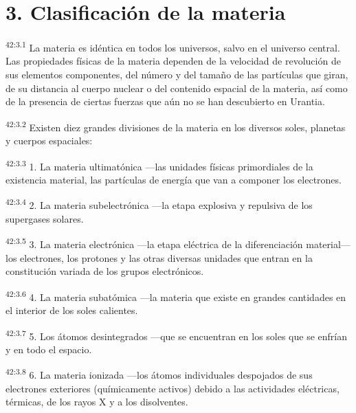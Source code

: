 \section*{3. Clasificación de la materia}
\par
\textsuperscript{42:3.1} La materia es idéntica en todos los universos, salvo en el universo central. Las propiedades físicas de la materia dependen de la velocidad de revolución de sus elementos componentes, del número y del tamaño de las partículas que giran, de su distancia al cuerpo nuclear o del contenido espacial de la materia, así como de la presencia de ciertas fuerzas que aún no se han descubierto en Urantia.

\par
\textsuperscript{42:3.2} Existen diez grandes divisiones de la materia en los diversos soles, planetas y cuerpos espaciales:

\par
\textsuperscript{42:3.3} 1. La materia ultimatónica ---las unidades físicas primordiales de la existencia material, las partículas de energía que van a componer los electrones.

\par
\textsuperscript{42:3.4} 2. La materia subelectrónica ---la etapa explosiva y repulsiva de los supergases solares.

\par
\textsuperscript{42:3.5} 3. La materia electrónica ---la etapa eléctrica de la diferenciación material--- los electrones, los protones y las otras diversas unidades que entran en la constitución variada de los grupos electrónicos.

\par
\textsuperscript{42:3.6} 4. La materia subatómica ---la materia que existe en grandes cantidades en el interior de los soles calientes.

\par
\textsuperscript{42:3.7} 5. Los átomos desintegrados ---que se encuentran en los soles que se enfrían y en todo el espacio.

\par
\textsuperscript{42:3.8} 6. La materia ionizada ---los átomos individuales despojados de sus electrones exteriores (químicamente activos) debido a las actividades eléctricas, térmicas, de los rayos X y a los disolventes.

